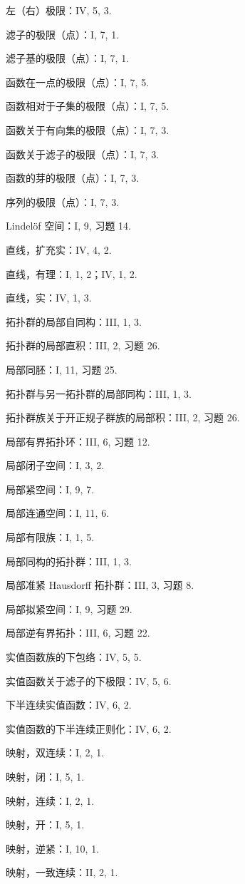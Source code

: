 左（右）极限：IV, 5, 3.

滤子的极限（点）：I, 7, 1.

滤子基的极限（点）：I, 7, 1.

函数在一点的极限（点）：I, 7, 5.

函数相对于子集的极限（点）：I, 7, 5.

函数关于有向集的极限（点）：I, 7, 3.

函数关于滤子的极限（点）：I, 7, 3.

函数的芽的极限（点）：I, 7, 3.

序列的极限（点）：I, 7, 3.

Lindelöf 空间：I, 9, 习题 14.

直线，扩充实：IV, 4, 2.

直线，有理：I, 1, 2；IV, 1, 2.

直线，实：IV, 1, 3.

拓扑群的局部自同构：III, 1, 3.

拓扑群的局部直积：III, 2, 习题 26.

局部同胚：I, 11, 习题 25.

拓扑群与另一拓扑群的局部同构：III, 1, 3.

拓扑群族关于开正规子群族的局部积：III, 2, 习题 26.

局部有界拓扑环：III, 6, 习题 12.

局部闭子空间：I, 3, 2.

局部紧空间：I, 9, 7.

局部连通空间：I, 11, 6.

局部有限族：I, 1, 5.

局部同构的拓扑群：III, 1, 3.

局部准紧 Hausdorff 拓扑群：III, 3, 习题 8.

局部拟紧空间：I, 9, 习题 29.

局部逆有界拓扑：III, 6, 习题 22.

实值函数族的下包络：IV, 5, 5.

实值函数关于滤子的下极限：IV, 5, 6.

下半连续实值函数：IV, 6, 2.

实值函数的下半连续正则化：IV, 6, 2.

映射，双连续：I, 2, 1.

映射，闭：I, 5, 1.

映射，连续：I, 2, 1.

映射，开：I, 5, 1.

映射，逆紧：I, 10, 1.

映射，一致连续：II, 2, 1.

